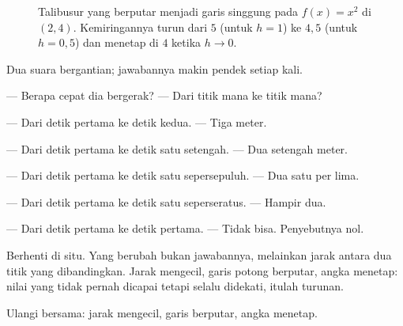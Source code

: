 \begin{figure}[htbp]
\centering
{}
\caption{Talibusur yang berputar menjadi garis singgung pada $f(x)=x^{2}$ di $(2,4)$.
Kemiringannya turun dari $5$ (untuk $h=1$) ke $4{,}5$ (untuk $h=0{,}5$) dan menetap di $4$
ketika $h\to0$.}
\label{fig:sekan-singgung}
\end{figure}

\begin{bacakeras}
Dua suara bergantian; jawabannya makin pendek setiap kali.

--- Berapa cepat dia bergerak? --- Dari titik mana ke titik mana?

--- Dari detik pertama ke detik kedua. --- Tiga meter.

--- Dari detik pertama ke detik satu setengah. --- Dua setengah meter.

--- Dari detik pertama ke detik satu sepersepuluh. --- Dua satu per lima.

--- Dari detik pertama ke detik satu seperseratus. --- Hampir dua.

--- Dari detik pertama ke detik pertama. --- Tidak bisa. Penyebutnya nol.

Berhenti di situ. Yang berubah bukan jawabannya, melainkan jarak antara dua titik yang
dibandingkan. Jarak mengecil, garis potong berputar, angka menetap: nilai yang tidak pernah
dicapai tetapi selalu didekati, itulah turunan.

Ulangi bersama: jarak mengecil, garis berputar, angka menetap.
\end{bacakeras}

